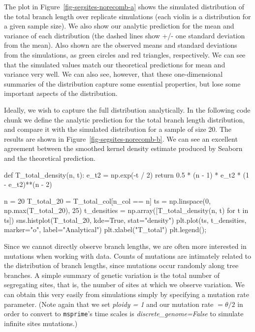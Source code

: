 \documentclass[graybox]{svmult}
\newcommand{\msprime}[0]{\texttt{msprime}}
\begin{document}
    The plot in Figure~\ref{fig-segsites-norecomb-a} shows the simulated
distribution of the total branch length
over replicate simulations (each violin is a distribution for a given
sample size). We also show our analytic prediction for the mean and
variance of each distribution (the dashed lines show +/- one standard
deviation from the mean). Also shown are the observed means and standard
deviations from the simulations, as green circles and red triangles,
respectively. We can see that the simulated values match our theoretical
predictions for mean and variance very well. We can also see, however,
that these one-dimensional summaries of the distribution capture some
essential properties, but lose some important aspects of the
distribution.

    Ideally, we wish to capture the full distribution analytically. In the following code chunk we define the analytic
prediction for the total branch length distribution, and compare it with the simulated distribution for a sample of size 20. The results are shown in
Figure~\ref{fig-segsites-norecomb-b}. We can see an excellent agreement between
the smoothed kernel
density estimate produced by Seaborn and the theoretical prediction.

\begin{pythoncode}
def T_total_density(n, t):
    e_t2 = np.exp(-t / 2)
    return 0.5 * (n - 1) * e_t2 * (1 - e_t2)**(n - 2)

n = 20
T_total_20 = T_total_col[n_col == n]
ts = np.linspace(0, np.max(T_total_20), 25)
t_densities = np.array([T_total_density(n, t) for t in ts])
sns.histplot(T_total_20, kde=True, stat="density")
plt.plot(ts, t_densities, marker="o", label="Analytical")
plt.xlabel("T_total")
plt.legend();
\end{pythoncode}

Since we cannot directly observe branch lengths, we are often more
interested in mutations when working with data. Counts of mutations are
intimately related to the distribution of branch lengths, since
mutations occur randomly along tree branches. A simple summary
of genetic variation is the total number of segregating sites, that is, the number of
sites at which we observe variation. We can obtain this very
easily from simulations simply by specifying a mutation rate parameter.
(Note again that we set \emph{ploidy = 1} and our mutation rate
\(= \theta / 2\) in order to convert to \msprime's time scales
is \emph{discrete\_genome=False} to simulate infinite sites
mutations.)
\end{document}
